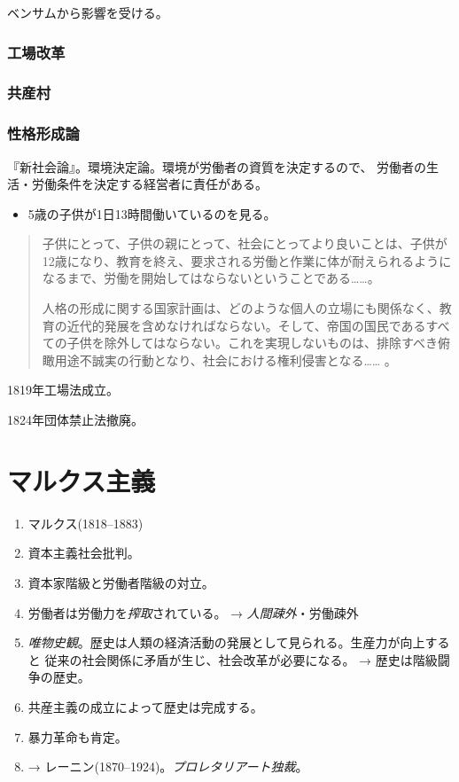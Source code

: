 \documentclass[uplatex,dvipdfmx]{jsarticle} \usepackage{mystyle}%
\begin{document}
ベンサムから影響を受ける。

\subsubsection{工場改革}



\subsubsection{共産村}


\subsubsection{性格形成論}

『新社会論』。環境決定論。環境が労働者の資質を決定するので、
労働者の生活・労働条件を決定する経営者に責任がある。

\begin{itemize}
\item 5歳の子供が1日13時間働いているのを見る。
\end{itemize}

\begin{quotation}
  子供にとって、子供の親にとって、社会にとってより良いことは、子供が12歳になり、教育を終え、要求される労働と作業に体が耐えられるようになるまで、労働を開始してはならないということである……。

  人格の形成に関する国家計画は、どのような個人の立場にも関係なく、教育の近代的発展を含めなければならない。そして、帝国の国民であるすべての子供を除外してはならない。これを実現しないものは、排除すべき俯瞰用途不誠実の行動となり、社会における権利侵害となる……
。
\end{quotation}

1819年工場法成立。

1824年団体禁止法撤廃。


\section{マルクス主義}

\begin{enumerate}

\item マルクス(1818--1883)
\item 資本主義社会批判。
\item 資本家階級と労働者階級の対立。
\item 労働者は労働力を\emph{搾取}されている。 → \emph{人間疎外}・労働疎外
\item \emph{唯物史観}。歴史は人類の経済活動の発展として見られる。生産力が向上すると
従来の社会関係に矛盾が生じ、社会改革が必要になる。 → 歴史は階級闘争の歴史。
\item 共産主義の成立によって歴史は完成する。
\item 暴力革命も肯定。
\item → レーニン(1870--1924)。\emph{プロレタリアート独裁}。
\end{enumerate}
\end{document}
